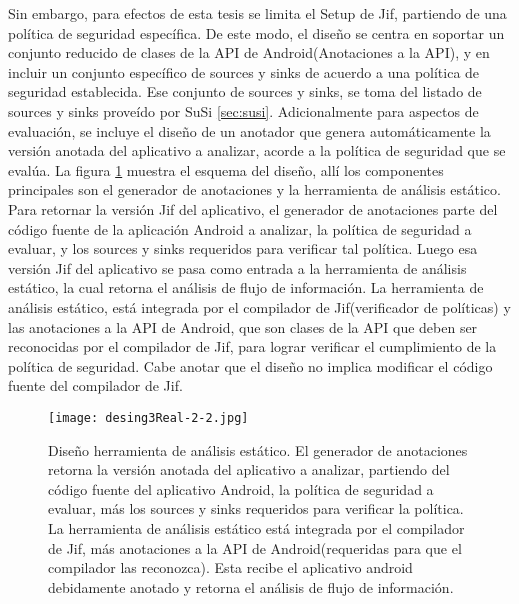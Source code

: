 Sin embargo, para efectos de esta tesis se limita el Setup de Jif, partiendo de
una política de seguridad específica. De este modo, el diseño se centra en
soportar un conjunto reducido de clases de la API de Android(Anotaciones a la
API), y en incluir un conjunto específico de sources y sinks de acuerdo a una
política de seguridad establecida. Ese conjunto de sources y sinks, se toma del
listado de sources y sinks proveído por SuSi \ref{sec:susi}.\newline 
Adicionalmente para aspectos de evaluación, se incluye el diseño de un anotador
que genera automáticamente la versión anotada del aplicativo a analizar, acorde
a la política de seguridad que se evalúa.\newline 
La figura \ref{fig:desingReal} muestra el esquema del diseño, allí  los
componentes principales son el generador de anotaciones y la herramienta de
análisis estático. Para retornar la versión Jif del aplicativo, el generador de
anotaciones parte del código fuente de la aplicación Android a analizar, la
política de seguridad a evaluar, y los sources y sinks requeridos para
verificar tal política.\newline
Luego esa versión Jif del aplicativo se pasa como entrada a la herramienta de
análisis estático, la cual retorna el análisis de flujo de información.\newline
La herramienta de análisis estático, está integrada por el compilador de
Jif(verificador de políticas) y las anotaciones a la API de Android, que son
clases de la API que deben ser reconocidas por el compilador de Jif, para lograr
verificar el cumplimiento de la política de seguridad. Cabe anotar que el diseño
no implica modificar el código fuente del compilador de Jif.
\begin{figure}[t!]
	\begin{center} 
	\texttt{[image: desing3Real-2-2.jpg]} 
	\end{center}
	\caption{Diseño herramienta de análisis estático. 
	El generador de anotaciones retorna la versión anotada del aplicativo a
	analizar, partiendo del código fuente del aplicativo Android, la
	política de seguridad a evaluar, más los sources y sinks requeridos para
	verificar la política. La herramienta de análisis estático está integrada por
	el compilador de Jif, más anotaciones a la API de Android(requeridas para que
	el compilador las reconozca). Esta recibe el aplicativo android debidamente
	anotado y retorna el análisis de flujo de información.}
	\label{fig:desingReal}
\end{figure}

